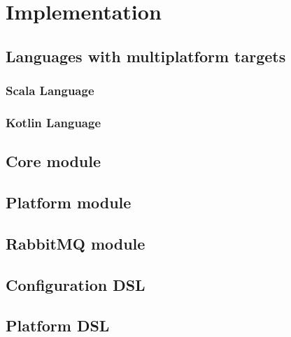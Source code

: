 \chapter{Implementation} %
\label{chap:implementation}

\section{Languages with multiplatform targets}
\label{sec:languages-multiplatform-targets}

\subsection{Scala Language}
\label{sec:scala-language}

\subsection{Kotlin Language}
\label{sec:kotlin-language}


\section{Core module}
\label{sec:core-module-impl}


\section{Platform module}
\label{sec:platform-module-impl}


\section{RabbitMQ module}
\label{sec:rabbitmq-module-impl}


\section{Configuration DSL}
\label{sec:configuration-dsl-impl}


\section{Platform DSL}
\label{sec:platform-dsl-impl}
